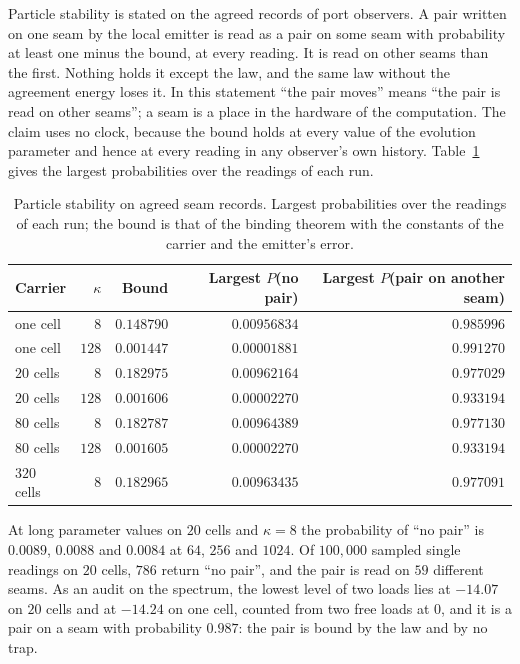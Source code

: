 Particle stability is stated on the agreed records of port observers. A pair written on
one seam by the local emitter is read as a pair on some seam with probability at least one
minus the bound, at every reading. It is read on other seams than the first. Nothing holds
it except the law, and the same law without the agreement energy loses it. In this
statement ``the pair moves'' means ``the pair is read on other seams''; a seam is a place
in the hardware of the computation. The claim uses no clock, because the bound holds at
every value of the evolution parameter and hence at every reading in any observer's own
history. Table~\ref{tab:psv-stability} gives the largest probabilities over the readings
of each run.

\begin{table}[htbp]
\centering\small
\caption{Particle stability on agreed seam records. Largest probabilities over the
readings of each run; the bound is that of the binding theorem with the constants of
the carrier and the emitter's error.}
\label{tab:psv-stability}
\begin{tabular}{@{}lrrrr@{}}
\toprule
Carrier & $\kappa$ & Bound & Largest $P$(no pair) & Largest $P$(pair on another seam)\\
\midrule
one cell & $8$ & $0.148790$ & $0.00956834$ & $0.985996$\\
one cell & $128$ & $0.001447$ & $0.00001881$ & $0.991270$\\
$20$ cells & $8$ & $0.182975$ & $0.00962164$ & $0.977029$\\
$20$ cells & $128$ & $0.001606$ & $0.00002270$ & $0.933194$\\
$80$ cells & $8$ & $0.182787$ & $0.00964389$ & $0.977130$\\
$80$ cells & $128$ & $0.001605$ & $0.00002270$ & $0.933194$\\
$320$ cells & $8$ & $0.182965$ & $0.00963435$ & $0.977091$\\
\bottomrule
\end{tabular}
\end{table}

At long parameter values on $20$ cells and $\kappa=8$ the probability of ``no pair'' is
$0.0089$, $0.0088$ and $0.0084$ at $64$, $256$ and $1024$. Of $100{,}000$ sampled single
readings on $20$ cells, $786$ return ``no pair'', and the pair is read on $59$ different
seams. As an audit on the spectrum, the lowest level of two loads lies at $-14.07$ on $20$
cells and at $-14.24$ on one cell, counted from two free loads at $0$, and it is a pair on a
seam with probability $0.987$: the pair is bound by the law and by no trap.

